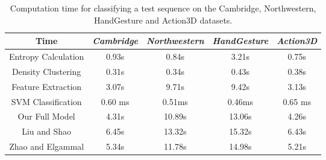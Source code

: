 \documentclass[5p]{elsarticle}
\begin{document}
\begin{table*}[!htbp]
	\centering
	\caption{Computation time for classifying a test sequence on the Cambridge, Northwestern, HandGesture and Action3D datasets.}
\begin{tabular}{c|c|c|c|c} \hline
		Time                                        & \emph{Cambridge} & \emph{Northwestern} & \emph{HandGesture} & \emph{Action3D} \\ \hline
		Entropy Calculation                 &  0.93s          & 0.84s                &   3.21s            & 0.75s \\
		Density Clustering                   &  0.31s          & 0.34s                 &   0.43s            & 0.38s \\
		Feature Extraction                   &  3.07s          & 9.71s                  &  9.42s             & 3.13s \\  
		SVM Classification                  &  0.60 ms       & 0.51ms               & 0.46ms          & 0.65 ms \\  \hline \hline
		Our Full Model                        &  4.31s           & 10.89s                & 13.06s            & 4.26s  \\ \hline 
		Liu and Shao \cite{liu2013synthesis} & 6.45s & 13.32s                & 15.32s              & 6.43s \\ \hline
		Zhao and Elgammal \cite{zhao2008information} & 5.34s & 11.78s       & 14.98s             &  5.21s \\ \hline
	\end{tabular}
	\label{Tab:efficiency}
\end{table*}
\end{document}

